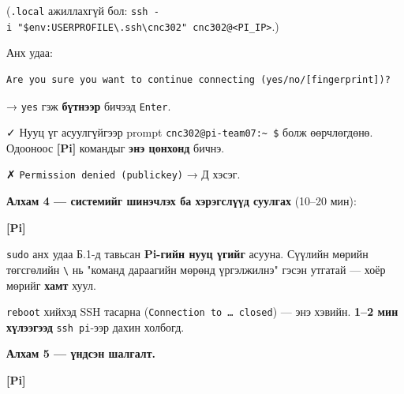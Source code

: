 \begin{Shaded}
\begin{Highlighting}[]
\end{Highlighting}
\end{Shaded}

(\texttt{.local} ажиллахгүй бол: \texttt{ssh\ -i\ "\$env:\allowbreak{}USERPROFILE\textbackslash{}\allowbreak{}.\allowbreak{}ssh\textbackslash{}\allowbreak{}cnc302"\ cnc302@\textless{}PI\_\allowbreak{}IP\textgreater{}}.)

Анх удаа:

\begin{verbatim}
Are you sure you want to continue connecting (yes/no/[fingerprint])?
\end{verbatim}

→ \texttt{yes} гэж \textbf{бүтнээр} бичээд \texttt{Enter}.

✓ Нууц үг асуулгүйгээр prompt \texttt{cnc302@pi-team07:\textasciitilde{}\ \$} болж өөрчлөгдөнө. Одооноос \textbf{{[}Pi{]}} командыг \textbf{энэ цонхонд} бичнэ.

✗ \texttt{Permission\ denied\ (publickey)} → Д хэсэг.

\textbf{Алхам 4 --- системийг шинэчлэх ба хэрэгслүүд суулгах} (10--20 мин):

\textbf{{[}Pi{]}}

\begin{Shaded}
\begin{Highlighting}[]
\KeywordTok{\textbackslash{}}
\end{Highlighting}
\end{Shaded}

\texttt{sudo} анх удаа Б.1-д тавьсан \textbf{Pi-гийн нууц үгийг} асууна. Сүүлийн мөрийн төгсгөлийн \texttt{\textbackslash{}} нь "команд дараагийн мөрөнд үргэлжилнэ" гэсэн утгатай --- хоёр мөрийг \textbf{хамт} хуул.

\texttt{reboot} хийхэд SSH тасарна (\texttt{Connection\ to\ \ldots{}\ closed}) --- энэ хэвийн. \textbf{1--2 мин хүлээгээд} \texttt{ssh\ pi}-ээр дахин холбогд.

\textbf{Алхам 5 --- үндсэн шалгалт.}

\textbf{{[}Pi{]}}


